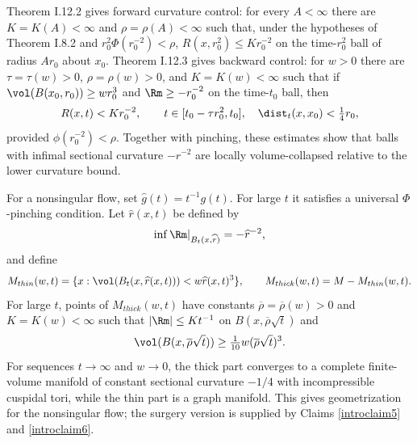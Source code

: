 Theorem I.12.2 gives forward curvature control: for every $A<\infty$ there
are $K=K(A)<\infty$ and $\rho=\rho(A)<\infty$ such that, under the
hypotheses of Theorem I.8.2 and
$r_0^2\Phi(r_0^{-2})<\rho$,
$R(x,r_0^2)\leq Kr_0^{-2}$ on the time-$r_0^2$ ball of radius $Ar_0$
about $x_0$.  Theorem I.12.3 gives backward control: for $w>0$ there are
$\tau=\tau(w)>0$, $\rho=\rho(w)>0$, and $K=K(w)<\infty$ such that if
$\vol(B(x_0,r_0))\geq wr_0^3$ and $\Rm\geq-r_0^{-2}$ on the time-$t_0$
ball, then
\[
R(x,t)<Kr_0^{-2},\qquad
t\in[t_0-\tau r_0^2,t_0],\quad
\dist_t(x,x_0)<\tfrac14r_0,
\]
provided $\phi(r_0^{-2})<\rho$.  Together with pinching, these estimates
show that balls with infimal sectional curvature $-r^{-2}$ are locally
volume-collapsed relative to the lower curvature bound.

For a nonsingular flow, set $\widehat g(t)=t^{-1}g(t)$.  For large $t$ it
satisfies a universal $\Phi$-pinching condition.  Let $\widehat r(x,t)$ be
defined by
\[
\inf\Rm|_{B_t(x,\widehat r)}=-\widehat r^{-2},
\]
and define
\[
M_{thin}(w,t)=\{x:\vol(B_t(x,\widehat r(x,t)))<w\widehat r(x,t)^3\},
\qquad M_{thick}(w,t)=M-M_{thin}(w,t).
\]
For large $t$, points of $M_{thick}(w,t)$ have constants
$\overline\rho=\overline\rho(w)>0$ and $K=K(w)<\infty$ such that
$|\Rm|\leq Kt^{-1}$ on $B(x,\overline\rho\sqrt t)$ and
\[
\vol(B(x,\overline\rho\sqrt t))
\geq \tfrac1{10}w(\overline\rho\sqrt t)^3.
\]
For sequences $t\rightarrow\infty$ and $w\rightarrow0$, the thick part
converges to a complete finite-volume manifold of constant sectional
curvature $-1/4$ with incompressible cuspidal tori, while the thin part is a
graph manifold.  This gives geometrization for the nonsingular flow; the
surgery version is supplied by Claims \ref{introclaim5} and
\ref{introclaim6}.
